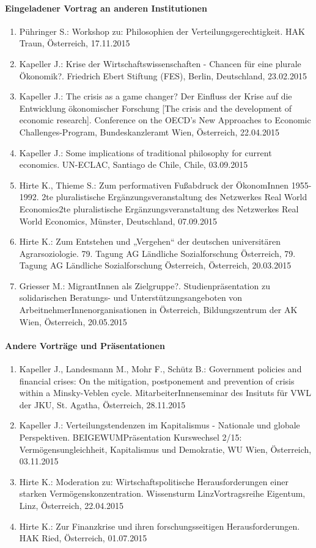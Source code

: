 \paragraph{Eingeladener Vortrag an anderen Institutionen}
\begin{enumerate}
	\item Pühringer S.: Workshop zu: Philosophien der Verteilungsgerechtigkeit. HAK Traun, Österreich, 17.11.2015
	\item Kapeller J.: Krise der Wirtschaftswissenschaften - Chancen für eine plurale Ökonomik?. Friedrich Ebert Stiftung (FES), Berlin, Deutschland, 23.02.2015
	\item Kapeller J.: The crisis as a game changer? Der Einfluss der Krise auf die Entwicklung ökonomischer Forschung [The crisis and the development of economic research]. Conference on the OECD's \glqq New Approaches to Economic Challenges\grqq{}-Program, Bundeskanzleramt Wien, Österreich, 22.04.2015
	\item Kapeller J.: Some implications of traditional philosophy for current economics. UN-ECLAC, Santiago de Chile, Chile, 03.09.2015
	\item Hirte K., Thieme S.: Zum performativen Fußabdruck der ÖkonomInnen 1955-1992. 2te pluralistische Ergänzungsveranstaltung des Netzwerkes Real World Economics2te pluralistische Ergänzungsveranstaltung des Netzwerkes Real World Economics, Münster, Deutschland, 07.09.2015
	\item Hirte K.: Zum Entstehen und „Vergehen“ der deutschen universitären Agrarsoziologie. 79. Tagung AG Ländliche Sozialforschung Österreich, 79. Tagung AG Ländliche Sozialforschung Österreich, Österreich, 20.03.2015
	\item Griesser M.: MigrantInnen als Zielgruppe?. Studienpräsentation zu solidarischen Beratungs- und Unterstützungsangeboten von ArbeitnehmerInnenorganisationen in Österreich, Bildungszentrum der AK Wien, Österreich, 20.05.2015
\end{enumerate}
\paragraph{Andere Vorträge und Präsentationen}
\begin{enumerate}
	\item Kapeller J., Landesmann M., Mohr F., Schütz B.: Government policies and financial crises: On the mitigation, postponement and prevention of crisis within a Minsky-Veblen cycle. MitarbeiterInnenseminar des Insituts für VWL der JKU, St. Agatha, Österreich, 28.11.2015
	\item Kapeller J.: Verteilungstendenzen im Kapitalismus - Nationale und globale Perspektiven. BEIGEWUMPräsentation Kurswechsel 2/15: Vermögensungleichheit, Kapitalismus und Demokratie, WU Wien, Österreich, 03.11.2015
	\item Hirte K.: Moderation zu: Wirtschaftspolitische Herausforderungen einer starken Vermögenskonzentration. Wissensturm LinzVortragsreihe \glqq Eigentum\grqq{}, Linz, Österreich, 22.04.2015
	\item Hirte K.: Zur Finanzkrise und ihren forschungsseitigen Herausforderungen. HAK Ried, Österreich, 01.07.2015
\end{enumerate}
